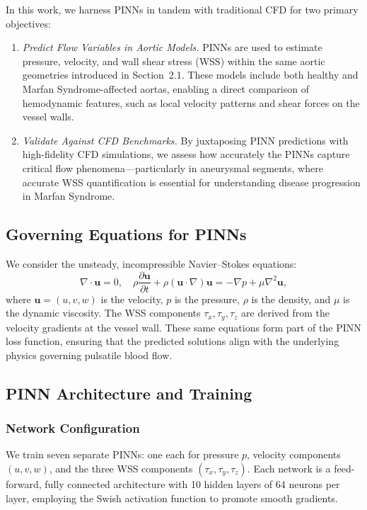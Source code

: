 \documentclass[12pt, a4paper]{article}
\begin{document}
In this work, we harness PINNs in tandem with traditional CFD for two primary objectives:
\begin{enumerate}
    \item \emph{Predict Flow Variables in Aortic Models.} PINNs are used to estimate pressure, velocity, and wall shear stress (WSS) within the same aortic geometries introduced in Section~2.1. These models include both healthy and Marfan Syndrome-affected aortas, enabling a direct comparison of hemodynamic features, such as local velocity patterns and shear forces on the vessel walls.

    \item \emph{Validate Against CFD Benchmarks.} By juxtaposing PINN predictions with high-fidelity CFD simulations, we assess how accurately the PINNs capture critical flow phenomena—particularly in aneurysmal segments, where accurate WSS quantification is essential for understanding disease progression in Marfan Syndrome.
\end{enumerate}

\subsection{Governing Equations for PINNs}
We consider the unsteady, incompressible Navier--Stokes equations:
\begin{equation}
\nabla \cdot \mathbf{u} = 0,
\quad
\rho \frac{\partial \mathbf{u}}{\partial t} + \rho (\mathbf{u} \cdot \nabla)\mathbf{u}
= -\nabla p + \mu \nabla^2 \mathbf{u},
\end{equation}
where $\mathbf{u} = (u,v,w)$ is the velocity, $p$ is the pressure, $\rho$ is the density, and $\mu$ is the dynamic viscosity. The WSS components $\tau_x, \tau_y, \tau_z$ are derived from the velocity gradients at the vessel wall. These same equations form part of the PINN loss function, ensuring that the predicted solutions align with the underlying physics governing pulsatile blood flow.

\subsection{PINN Architecture and Training}
\label{sec:PINN_Architecture_Training}

\subsubsection{Network Configuration}

We train seven separate PINNs: one each for pressure $p$, velocity components $(u, v, w)$, and the three WSS components $(\tau_x, \tau_y, \tau_z)$. Each network is a feed-forward, fully connected architecture with 10 hidden layers of 64 neurons per layer, employing the Swish activation function to promote smooth gradients.
\end{document}
